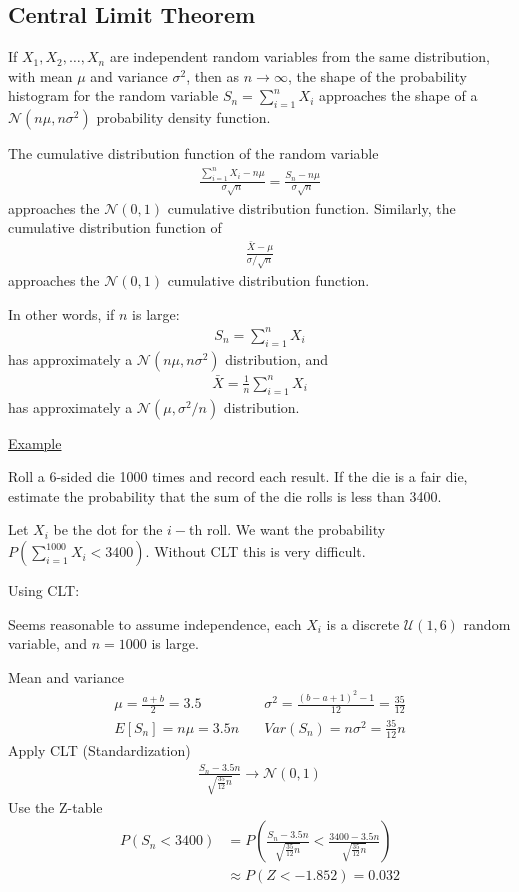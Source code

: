 \documentclass{article}
\begin{document}
\subsection{Central Limit Theorem}

If $X_1, X_2, \ldots, X_n$ are independent random variables from the same distribution, with mean $\mu$ and variance $\sigma^2$, then as $n \to \infty$, the shape of the probability histogram for the random variable $S_n = \sum_{i=1}^n X_i$ approaches the shape of a $\mathcal{N}(n\mu,n\sigma^2)$ probability density function. 

The cumulative distribution function of the random variable
\begin{align*}
    \frac{\sum_{i=1}^n X_i - n\mu}{\sigma \sqrt{n}} = \frac{S_n - n \mu}{\sigma \sqrt{n}}
\end{align*}
approaches the $\mathcal{N}(0,1)$ cumulative distribution function. Similarly, the cumulative distribution function of
\begin{align*}
    \frac{\bar{X} - \mu}{\sigma / \sqrt{n}}
\end{align*}
approaches the $\mathcal{N}(0,1)$ cumulative distribution function. 


In other words, if $n$ is large:
\begin{align*}
    S_n = \sum_{i=1}^n X_i
\end{align*}
has approximately a $\mathcal{N}(n\mu,n\sigma^2)$ distribution, and
\begin{align*}
    \bar{X} = \frac{1}{n} \sum_{i=1}^n X_i
\end{align*}
has approximately a $\mathcal{N}(\mu, \sigma^2 / n)$ distribution. 

\underline{Example}

Roll a 6-sided die 1000 times and record each result. If the die is a fair die, estimate the probability that the sum of the die rolls is less than 3400.

Let $X_i$ be the dot for the $i-$th roll. We want the probability $P(\sum_{i=1}^{1000}X_i < 3400)$. Without CLT this is very difficult. 

Using CLT:

Seems reasonable to assume independence, each $X_i$ is a discrete $\mathcal{U}(1,6)$ random variable, and $n = 1000$ is large.

Mean and variance
\begin{align*}
    \mu = \frac{a + b}{2} = 3.5 &\quad \sigma^2 = \frac{(b-a+1)^2 - 1}{12} = \frac{35}{12} \\
    E[S_n] = n \mu = 3.5n &\quad Var(S_n) = n \sigma^2 = \frac{35}{12}n
\end{align*}
Apply CLT (Standardization)
\begin{align*}
    \frac{S_n- 3.5n}{\sqrt{\frac{35}{12} n}} \to \mathcal{N}(0,1)
\end{align*}
Use the Z-table
\begin{align*}
    P(S_n < 3400) &= P\left ( \frac{S_n - 3.5n}{\sqrt{\frac{35}{12}n}} < \frac{3400-3.5n}{\sqrt{\frac{35}{12}n}}\right) \\
    &\approx P(Z < -1.852) = 0.032
\end{align*}
\end{document}
